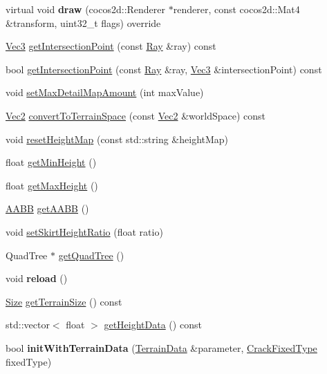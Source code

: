 \begin{DoxyCompactItemize}
\item 
\mbox{\label{classTerrain_a04ebfe6e5e978d0ee9bf2622f691e345}} 
virtual void {\bfseries draw} (cocos2d\+::\+Renderer $\ast$renderer, const cocos2d\+::\+Mat4 \&transform, uint32\+\_\+t flags) override
\item 
\hyperlink{classVec3}{Vec3} \hyperlink{classTerrain_ae2473c9297ec8ef1e14d227094d760bd}{get\+Intersection\+Point} (const \hyperlink{classRay}{Ray} \&ray) const
\item 
bool \hyperlink{classTerrain_a1455fb66bddeae92b522ce4523ed42f7}{get\+Intersection\+Point} (const \hyperlink{classRay}{Ray} \&ray, \hyperlink{classVec3}{Vec3} \&intersection\+Point) const
\item 
void \hyperlink{classTerrain_a8298eeb97583ef78a369151f0830c010}{set\+Max\+Detail\+Map\+Amount} (int max\+Value)
\item 
\hyperlink{classVec2}{Vec2} \hyperlink{classTerrain_a03a69dd84d9889e9c5644cf23a63ad6f}{convert\+To\+Terrain\+Space} (const \hyperlink{classVec2}{Vec2} \&world\+Space) const
\item 
void \hyperlink{classTerrain_a9fdf4b0a5b92fc5ac98c69dc41f7efab}{reset\+Height\+Map} (const std\+::string \&height\+Map)
\item 
float \hyperlink{classTerrain_af16a50d3b4818314a3c2ba8e7be6e0a1}{get\+Min\+Height} ()
\item 
float \hyperlink{classTerrain_a8a6f2132b654da2719044dc083297c0a}{get\+Max\+Height} ()
\item 
\hyperlink{classAABB}{A\+A\+BB} \hyperlink{classTerrain_a395a7b07be9d78fae2920bf9d2e51ace}{get\+A\+A\+BB} ()
\item 
void \hyperlink{classTerrain_a5a53caf1917be26897f35e35ae5b4f06}{set\+Skirt\+Height\+Ratio} (float ratio)
\item 
Quad\+Tree $\ast$ \hyperlink{classTerrain_a02299bde517f65a24e4604e4da08c436}{get\+Quad\+Tree} ()
\item 
\mbox{\label{classTerrain_ac7c6f714deaf475d98a32f6225a8943d}} 
void {\bfseries reload} ()
\item 
\hyperlink{classSize}{Size} \hyperlink{classTerrain_ae1fb00c2c35c35fd5e0274e037c624a2}{get\+Terrain\+Size} () const
\item 
std\+::vector$<$ float $>$ \hyperlink{classTerrain_aa00c8051d3fbc53ea1656702fb90ee6e}{get\+Height\+Data} () const
\item 
\mbox{\label{classTerrain_a66fd207f84be86a6203fd42ffb88579f}} 
bool {\bfseries init\+With\+Terrain\+Data} (\hyperlink{structTerrain_1_1TerrainData}{Terrain\+Data} \&parameter, \hyperlink{classTerrain_af3dc2d6c44474fdbd9552d69e553ef93}{Crack\+Fixed\+Type} fixed\+Type)
\end{DoxyCompactItemize}

